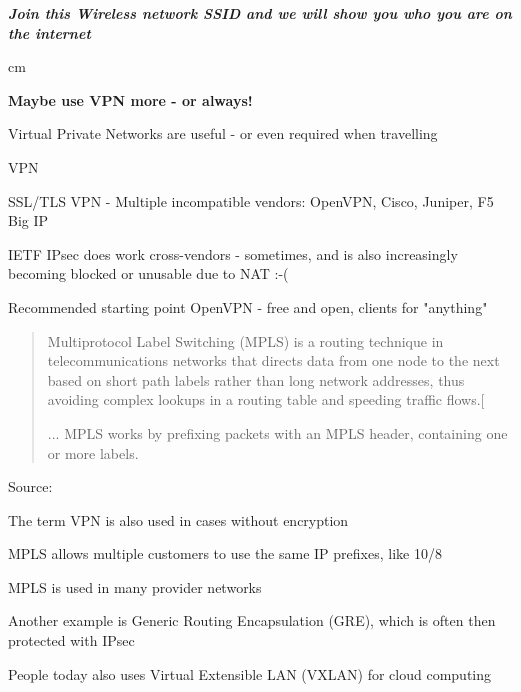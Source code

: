 \documentclass[Screen16to9,17pt]{foils}
\begin{document}
\emph{\bf Join this Wireless network SSID and we will show you who you are on the internet}

 cm
\centerline{\bf\Large Maybe use VPN more - or always!}



\begin{list1}
\item Virtual Private Networks are useful - or even required when travelling
\item VPN 
\item SSL/TLS VPN - Multiple incompatible vendors: OpenVPN, Cisco, Juniper, F5 Big IP
\item IETF IPsec does work cross-vendors - sometimes, and is also increasingly becoming blocked or unusable due to NAT :-(
\item Recommended starting point OpenVPN - free and open, clients for "anything"
\end{list1}


\begin{quote}
Multiprotocol Label Switching (MPLS) is a routing technique in telecommunications networks that directs data from one node to the next based on short path labels rather than long network addresses, thus avoiding complex lookups in a routing table and speeding traffic flows.[

...
MPLS works by prefixing packets with an MPLS header, containing one or more labels.
\end{quote}

Source:\\
{\footnotesize{}}

\begin{list2}
\item The term VPN is also used in cases without encryption
\item MPLS allows multiple customers to use the same IP prefixes, like 10/8
\item MPLS is used in many provider networks
\item Another example is Generic Routing Encapsulation (GRE), which is often then protected with IPsec
\item People today also uses Virtual Extensible LAN (VXLAN) for cloud computing
\end{list2}
\end{document}
